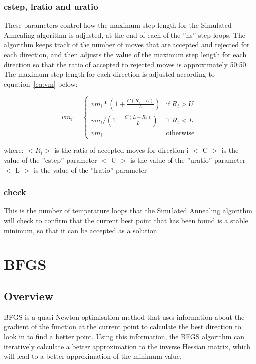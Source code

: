 \documentclass[10pt,twoside]{book}
\begin{document}
\subsubsection{cstep, lratio and uratio}
These parameters control how the maximum step length for the Simulated Annealing algorithm is adjusted, at the end of each of the ''ns'' step loops.  The algorithm keeps track of the number of moves that are accepted and rejected for each direction, and then adjusts the value of the maximum step length for each direction so that the ratio of accepted to rejected moves is approximately 50:50.  The maximum step length for each direction is adjusted according to equation~\ref{eq:vm} below:

\begin{equation}\label{eq:vm}
vm_{i} =
\begin{cases}
vm_{i} * (1 + \frac{C (R_{i} - U)}{L}) & \textrm{if $R_{i} > U$} \\
vm_{i} / (1 + \frac{C (L - R_{i})}{L}) & \textrm{if $R_{i} < L$} \\
vm_{i} & \textrm{otherwise}
\end{cases}
\end{equation}

where:\newline
$< R_{i} >$ is the ratio of accepted moves for direction i\newline
$<$ C $>$ is the value of the ''cstep'' parameter\newline
$<$ U $>$ is the value of the ''uratio'' parameter\newline
$<$ L $>$ is the value of the ''lratio'' parameter

\subsubsection{check}
This is the number of temperature loops that the Simulated Annealing algorithm will check to confirm that the current best point that has been found is a stable minimum, so that it can be accepted as a solution.

\section{BFGS}\label{sec:bfgs}
\subsection{Overview}\label{subsec:bfgsover}
BFGS is a quasi-Newton optimisation method that uses information about the gradient of the function at the current point to calculate the best direction to look in to find a better point.  Using this information, the BFGS algorithm can iteratively calculate a better approximation to the inverse Hessian matrix, which will lead to a better approximation of the minimum value.
\end{document}
